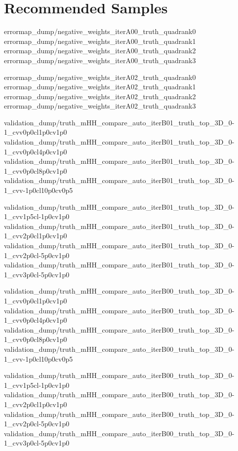     \section{Recommended Samples}

{errormap_dump/negative_weights_iterA00_truth_quadrank0}
{errormap_dump/negative_weights_iterA00_truth_quadrank1}
{errormap_dump/negative_weights_iterA00_truth_quadrank2}
{errormap_dump/negative_weights_iterA00_truth_quadrank3}

{errormap_dump/negative_weights_iterA02_truth_quadrank0}
{errormap_dump/negative_weights_iterA02_truth_quadrank1}
{errormap_dump/negative_weights_iterA02_truth_quadrank2}
{errormap_dump/negative_weights_iterA02_truth_quadrank3}


{validation_dump/truth_mHH_compare_auto_iterB01_truth_top_3D_0-1_cvv0p0cl1p0cv1p0}
{validation_dump/truth_mHH_compare_auto_iterB01_truth_top_3D_0-1_cvv0p0cl4p0cv1p0}
{validation_dump/truth_mHH_compare_auto_iterB01_truth_top_3D_0-1_cvv0p0cl8p0cv1p0}
{validation_dump/truth_mHH_compare_auto_iterB01_truth_top_3D_0-1_cvv-1p0cl10p0cv0p5}

{validation_dump/truth_mHH_compare_auto_iterB01_truth_top_3D_0-1_cvv1p5cl-1p0cv1p0}
{validation_dump/truth_mHH_compare_auto_iterB01_truth_top_3D_0-1_cvv2p0cl1p0cv1p0}
{validation_dump/truth_mHH_compare_auto_iterB01_truth_top_3D_0-1_cvv2p0cl-5p0cv1p0}
{validation_dump/truth_mHH_compare_auto_iterB01_truth_top_3D_0-1_cvv3p0cl-5p0cv1p0}

{validation_dump/truth_mHH_compare_auto_iterB00_truth_top_3D_0-1_cvv0p0cl1p0cv1p0}
{validation_dump/truth_mHH_compare_auto_iterB00_truth_top_3D_0-1_cvv0p0cl4p0cv1p0}
{validation_dump/truth_mHH_compare_auto_iterB00_truth_top_3D_0-1_cvv0p0cl8p0cv1p0}
{validation_dump/truth_mHH_compare_auto_iterB00_truth_top_3D_0-1_cvv-1p0cl10p0cv0p5}

{validation_dump/truth_mHH_compare_auto_iterB00_truth_top_3D_0-1_cvv1p5cl-1p0cv1p0}
{validation_dump/truth_mHH_compare_auto_iterB00_truth_top_3D_0-1_cvv2p0cl1p0cv1p0}
{validation_dump/truth_mHH_compare_auto_iterB00_truth_top_3D_0-1_cvv2p0cl-5p0cv1p0}
{validation_dump/truth_mHH_compare_auto_iterB00_truth_top_3D_0-1_cvv3p0cl-5p0cv1p0}
